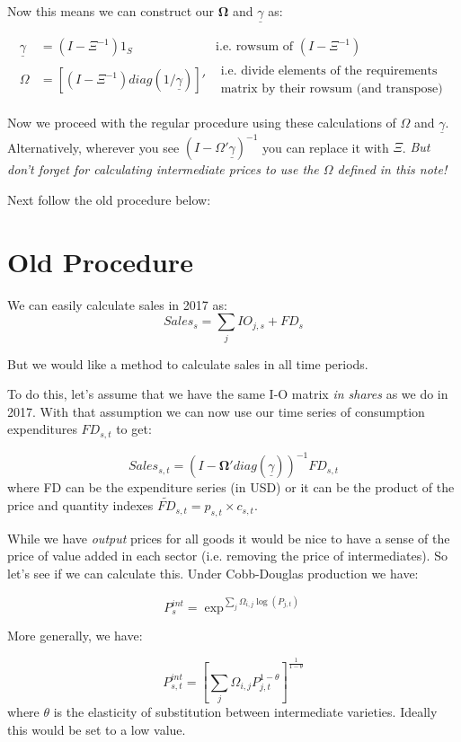 \documentclass[12pt,english]{article}
\begin{document}
Now this means we can construct our $\mathbold{\Omega}$ and $\underline{\gamma}$ as:

\begin{align*}
	\underline{\gamma} &= (I-\Xi^{-1})1_S &\text{i.e. rowsum of }(I-\Xi^{-1})\\
	\Omega &= [(I-\Xi^{-1})diag(1/\underline{\gamma})]'& \substack{\text{i.e. divide elements of the requirements}\\\text{matrix by their rowsum (and transpose)}}
\end{align*}

Now we proceed with the regular procedure using these calculations of $\Omega$ and $\underline{\gamma}$. Alternatively, wherever you see $(I-\Omega'\underline{\gamma})^{-1}$ you can replace it with $\Xi$. \emph{But don't forget for calculating intermediate prices to use the $\Omega$ defined in this note!}

Next follow the old procedure below:

\section*{Old Procedure}


We can easily calculate sales in 2017 as:
\[
	Sales_s = \sum_{j}IO_{j,s}+FD_s
\]

But we would like a method to calculate sales in all time periods.

To do this, let's assume that we have the same I-O matrix \emph{in shares} as we do in 2017. With that assumption we can now use our time series of consumption expenditures $FD_{s,t}$ to get:

\[
	Sales_{s,t} = (I-\mathbold{\Omega}'diag(\underline{\gamma}))^{-1}FD_{s,t} 
\]
where FD can be the expenditure series (in USD) or it can be the product of the price and quantity indexes $\widetilde{FD}_{s,t}=p_{s,t}\times c_{s,t}$.

While we have \emph{output} prices for all goods it would be nice to  have a sense of the price of value added in each sector (i.e. removing the price of intermediates). So let's see if we can calculate this. Under Cobb-Douglas production we have:

\[
	P_s^{int} = \exp^{\sum_{j}\Omega_{i,j}\log(P_{j,t})}
\]

More generally, we have:

\[
	P_{s,t}^{int} = \left[\sum_{j}\Omega_{i,j}P_{j,t}^{1-\theta}\right]^{\frac{1}{1-\theta}}
\]
where $\theta$ is the elasticity of substitution between intermediate varieties. Ideally this would be set to a low value.
\end{document}
